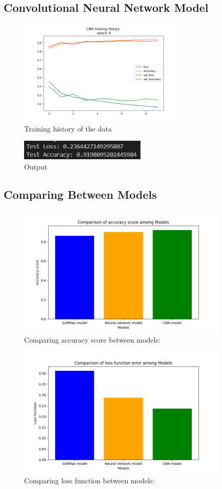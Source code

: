 \documentclass{article}
\begin{document}
\subsection{Convolutional Neural Network Model}
\begin{figure}[H]
    \caption{Training history of the data}
    \centering
    \includegraphics[width=8cm]{../imgFolder/CNN_fig.png}
\end{figure}

\begin{figure}[H]
    \caption{Output}
    \centering
    \includegraphics[width=6cm]{../imgFolder/CNNResult.png}
\end{figure}
\subsection{Comparing Between Models}
\begin{figure}[H]
    \caption{Comparing accuracy score between models: }
    \centering
    \includegraphics[width=10cm]{../imgFolder/accurateFuncComparison.png}
\end{figure}
\begin{figure}[H]
    \caption{Comparing loss function between models:}
    \centering
    \includegraphics[width=10cm]{../imgFolder/lossFuncComparison.png}
\end{figure}
\end{document}

